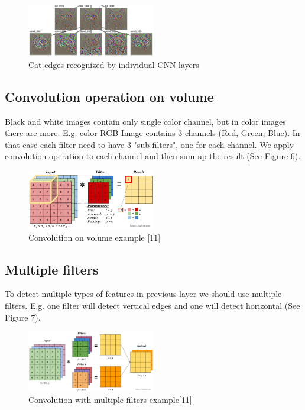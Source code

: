 \begin{figure}
\centering
\includegraphics[width=0.5\textwidth]{Images/cat-features.png}
\caption{Cat edges recognized by individual CNN layers\protect\footnotemark}
\end{figure}




\subsection{Convolution operation on volume}

Black and white images contain only single color channel, but in color images there are more. E.g. color RGB Image contains 3 channels (Red, Green, Blue). In that case each filter need to have 3 "sub filters", one for each channel. We apply convolution operation to each channel and then sum up the result (See Figure 6).  
\newline

\begin{figure}[ht]
\centering
\includegraphics[width=0.5\textwidth]{Images/convolution-operation-on-volume.png}
\caption{Convolution on volume example [11]}
\end{figure}

\subsection{Multiple filters}

To detect multiple types of features in previous layer we should use multiple filters. E.g. one filter will detect vertical edges and one will detect horizontal (See Figure 7).


\begin{figure}[ht]
\centering
\includegraphics[width=0.5\textwidth]{Images/convolution-with-multiple-filters.png}
\caption{Convolution with multiple filters example[11]}
\end{figure}


